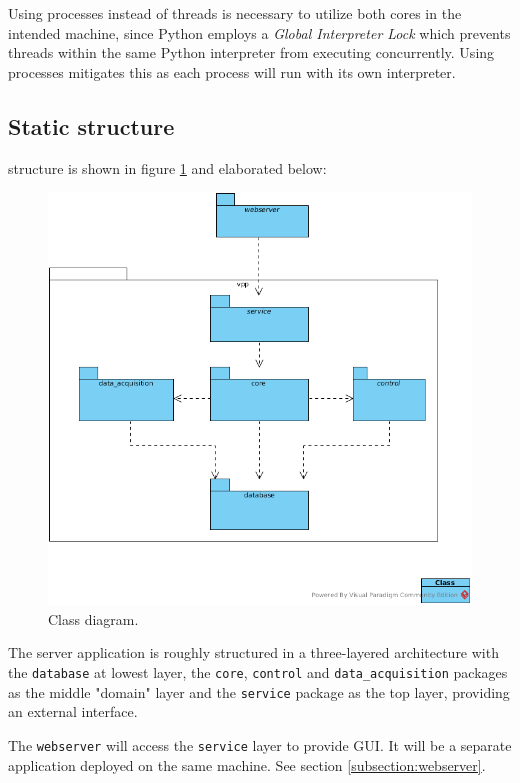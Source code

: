 Using processes instead of threads is necessary to utilize both cores in the intended machine, since Python employs a \emph{Global Interpreter Lock} which prevents threads within the same Python interpreter from executing concurrently. Using processes mitigates this as each process will run with its own interpreter. 

\subsection{Static structure}
structure is shown in figure \ref{figureClassDiagram} and elaborated below:

\begin{figure}[H]
    \centering
    \includegraphics[width=\textwidth]{figures/class_overview}
    \caption{Class diagram. }
    \label{figureClassDiagram}
\end{figure}

The server application is roughly structured in a three-layered architecture with the \texttt{database} at lowest layer, the \texttt{core}, \texttt{control} and \texttt{data\_acquisition} packages as the middle "domain" layer and the \texttt{service} package as the top layer, providing an external interface. 

The \texttt{webserver} will access the \texttt{service} layer to provide GUI. It will be a separate application deployed on the same machine. See section \ref{subsection:webserver}.



